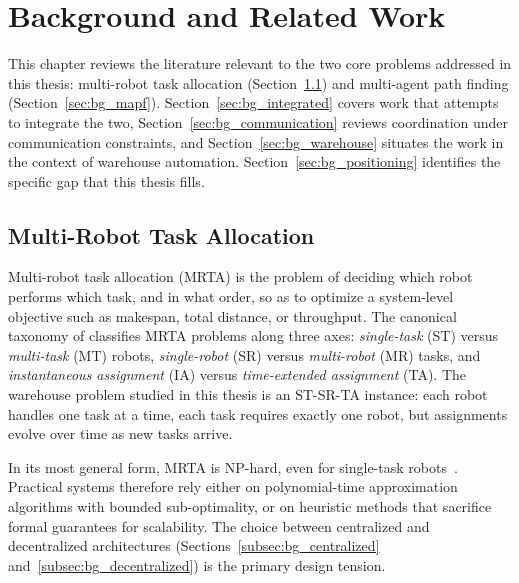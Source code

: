 \chapter{Background and Related Work}
\label{chap:background}

This chapter reviews the literature relevant to the two core problems addressed
in this thesis: multi-robot task allocation (Section~\ref{sec:bg_mrta}) and
multi-agent path finding (Section~\ref{sec:bg_mapf}).
Section~\ref{sec:bg_integrated} covers work that attempts to integrate the two,
Section~\ref{sec:bg_communication} reviews coordination under communication
constraints, and Section~\ref{sec:bg_warehouse} situates the work in the
context of warehouse automation.
Section~\ref{sec:bg_positioning} identifies the specific gap that this thesis
fills.


\section{Multi-Robot Task Allocation}
\label{sec:bg_mrta}

Multi-robot task allocation (MRTA) is the problem of deciding which robot
performs which task, and in what order, so as to optimize a system-level
objective such as makespan, total distance, or throughput.
The canonical taxonomy of \citet{gerkey2004formal} classifies MRTA problems
along three axes: \emph{single-task} (ST) versus \emph{multi-task} (MT) robots,
\emph{single-robot} (SR) versus \emph{multi-robot} (MR) tasks, and
\emph{instantaneous assignment} (IA) versus \emph{time-extended assignment}
(TA).
The warehouse problem studied in this thesis is an ST-SR-TA instance: each
robot handles one task at a time, each task requires exactly one robot, but
assignments evolve over time as new tasks arrive.

In its most general form, MRTA is NP-hard, even for single-task
robots~\cite{gerkey2004formal}.
Practical systems therefore rely either on polynomial-time approximation
algorithms with bounded sub-optimality, or on heuristic methods that sacrifice
formal guarantees for scalability.
The choice between centralized and decentralized architectures
      (Sections~\ref{subsec:bg_centralized} and~\ref{subsec:bg_decentralized})
is the primary design tension.


